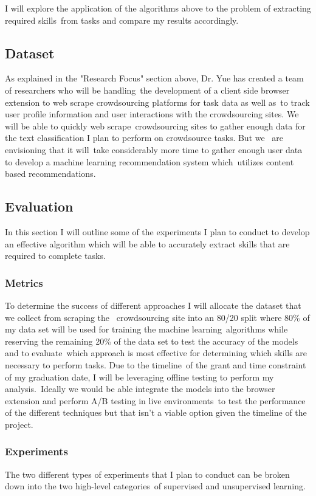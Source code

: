 \documentclass[letterpaper,12pt]{article}
\begin{document}
I will explore the application of the algorithms above to the problem of extracting required skills\
from tasks and compare my results accordingly.
\subsection{Dataset}
As explained in the "Research Focus" section above, Dr. Yue has created a team of researchers who will be handling\
the development of a client side browser extension to web scrape crowdsourcing platforms for task data as well as\
to track user profile information and user interactions with the crowdsourcing sites. We will be able to quickly web scrape\
crowdsourcing sites to gather enough data for the text classification I plan to perform on crowdsource tasks. But we \
are envisioning that it will\
take considerably more time to gather enough user data to develop a machine learning recommendation system which\
utilizes content based recommendations.

\subsection{Evaluation}
In this section I will outline some of the experiments I plan to conduct to develop an effective algorithm which
will be able to accurately extract skills that are required to complete tasks.

\subsubsection{Metrics}
To determine the success of different approaches I will allocate the dataset that we collect from scraping the \
crowdsourcing site into an 80/20 split where 80\% of my data set will be used for training the machine learning\
algorithms while reserving the remaining 20\% of the data set to test the accuracy of the models and to evaluate\
which approach is most effective for determining which skills are necessary to perform tasks. Due to the timeline\
of the grant and time constraint of my graduation date, I will be leveraging offline testing to perform my analysis.\
Ideally we would be able integrate the models into the browser extension and perform A/B testing in live environments\
to test the performance of the different techniques but that isn't a viable option given the timeline of the project.
\subsubsection{Experiments}
The two different types of experiments that I plan to conduct can be broken down into the two high-level categories\
of supervised and unsupervised learning.
\end{document}
